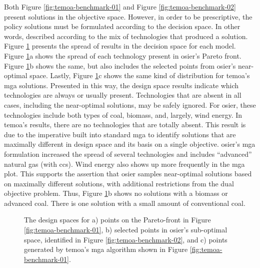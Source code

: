 Both Figure \ref{fig:temoa-benchmark-01} and Figure \ref{fig:temoa-benchmark-02}
present solutions in the objective space. However, in order to be prescriptive,
the policy solutions must be formulated according to the decision space. In
other words, described according to the mix of technologies that produced a
solution. Figure \ref{fig:temoa-benchmark-03} presents the spread of results in
the decision space for each model. Figure \ref{fig:temoa-benchmark-03}a shows
the spread of each technology present in \ac{osier}'s Pareto front. Figure
\ref{fig:temoa-benchmark-03}b shows the same, but also includes the
selected points from \ac{osier}'s near-optimal space. Lastly, Figure
\ref{fig:temoa-benchmark-03}c shows the same kind of distribution for
\ac{temoa}'s \ac{mga} solutions. Presented in this way, the design space results
indicate which technologies are always or usually present. Technologies that are
absent in all cases, including the near-optimal solutions, may be safely
ignored. For \ac{osier}, these technologies include both types of coal, biomass,
and, largely, wind energy. In \ac{temoa}'s results, there are no
technologies that are totally absent. This result is due to the imperative built
into standard \ac{mga} to identify solutions that are maximally different in
design space and its basis on a single objective. \ac{osier}'s \ac{mga} formulation
increased the spread of several technologies and includes ``advanced'' natural gas
(with \ac{ccs}). Wind energy also shows up more frequently in the \ac{mga} plot.
This supports the assertion that \ac{osier} samples near-optimal
solutions based on maximally different solutions, with additional restrictions 
from the dual objective problem. Thus, Figure \ref{fig:temoa-benchmark-03}b shows
no solutions with a biomass or advanced coal. There is one solution with a small amount
of conventional coal.

\newpage
\begin{figure}[ht!]
  \centering
  \resizebox{\columnwidth}{!}{}
  \caption{The design spaces for a) points on the Pareto-front in Figure
  \ref{fig:temoa-benchmark-01}, b) selected points in \ac{osier}'s sub-optimal
  space, identified in Figure \ref{fig:temoa-benchmark-02}, and c) points
  generated by \ac{temoa}'s \ac{mga} algorithm shown in Figure
  \ref{fig:temoa-benchmark-01}.}
  \label{fig:temoa-benchmark-03}
\end{figure}

 
\FloatBarrier